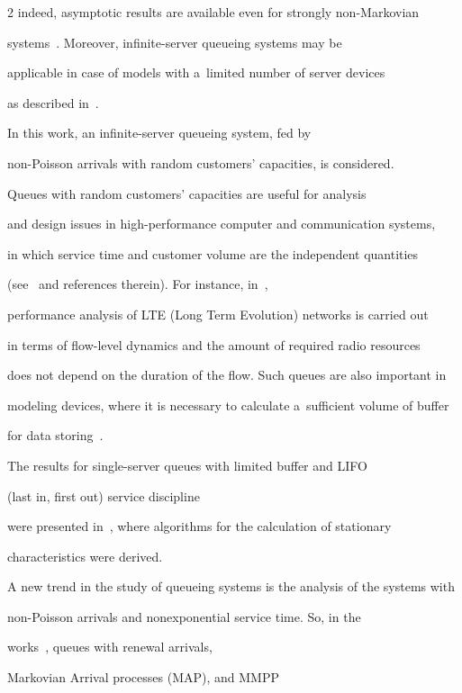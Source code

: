\begin{multicols}{2}
indeed, asymptotic results are available even for strongly non-Markovian 


systems~\cite{mandjes}. Moreover, infinite-server queueing systems may be 


applicable in case of models with a~limited number of server devices 


as described in~\cite{lit2}.





In this work,  an infinite-server queueing system, fed by 


non-Poisson arrivals with random customers' capacities, is considered.  


Queues with random customers' capacities are  useful for analysis 


and design issues in high-performance computer and communication systems, 


in which service time and customer volume are the independent quantities 


(see~\cite{lit8, lit10} and references therein). For instance, in~\cite{lit10}, 


performance analysis of LTE (Long Term Evolution) networks is carried out 


in terms of flow-level dynamics and the amount of required radio resources 


does not depend on the duration of the flow. Such queues are also important in 


modeling devices, where it is necessary to calculate a~sufficient volume of buffer 


for data storing~\cite{lit9, lit12}.


The results for single-server queues with limited buffer and LIFO 


(last in, first out) service discipline 


were presented in~\cite{lit13}, where algorithms for the calculation of stationary 


characteristics were derived. 





A new trend in the study of queueing systems is the analysis of the systems with 


non-Poisson arrivals and nonexponential service time. So, in the 


works~\cite{lit1, lit2, lit4, lit5, lit11}, queues with renewal arrivals, 


Markovian Arrival processes (MAP), and MMPP 



\end{multicols}
